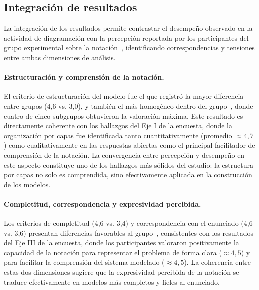 \subsection{Integración de resultados}
\noindent
La integración de los resultados permite contrastar el desempeño observado en la actividad de diagramación con la percepción reportada por los participantes del grupo experimental sobre la notación~\NDITI{}, identificando correspondencias y tensiones entre ambas dimensiones de análisis.

\paragraph{Estructuración y comprensión de la notación.}
El criterio de estructuración del modelo fue el que registró la mayor diferencia entre grupos (4,6 vs. 3,0), y también el más homogéneo dentro del grupo~\NDITI{}, donde cuatro de cinco subgrupos obtuvieron la valoración máxima. Este resultado es directamente coherente con los hallazgos del Eje I de la encuesta, donde la organización por capas fue identificada tanto cuantitativamente (promedio $\approx 4,7$) como cualitativamente en las respuestas abiertas como el principal facilitador de comprensión de la notación. La convergencia entre percepción y desempeño en este aspecto constituye uno de los hallazgos más sólidos del estudio: la estructura por capas no solo es comprendida, sino efectivamente aplicada en la construcción de los modelos.

\paragraph{Completitud, correspondencia y expresividad percibida.}
Los criterios de completitud (4,6 vs. 3,4) y correspondencia con el enunciado (4,6 vs. 3,6) presentan diferencias favorables al grupo~\NDITI{}, consistentes con los resultados del Eje III de la encuesta, donde los participantes valoraron positivamente la capacidad de la notación para representar el problema de forma clara ($\approx 4,5$) y para facilitar la comprensión del sistema modelado ($\approx 4,5$). La coherencia entre estas dos dimensiones sugiere que la expresividad percibida de la notación se traduce efectivamente en modelos más completos y fieles al enunciado.

